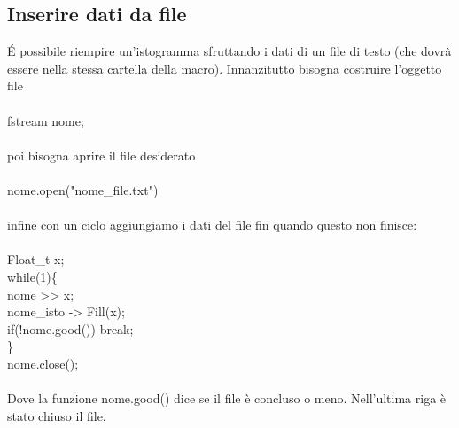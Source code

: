 \documentclass[10pt,a4paper]{article}
\begin{document}
\subsection{Inserire dati da file}
\'{E} possibile riempire un'istogramma sfruttando i dati di un file di testo (che dovrà essere nella stessa cartella della macro). Innanzitutto bisogna costruire l'oggetto file\\\\
fstream nome;\\\\
poi bisogna aprire il file desiderato\\\\
nome.open("nome\_file.txt")\\\\
infine con un ciclo aggiungiamo i dati del file fin quando questo non finisce:\\\\
Float\_t x;\\
while(1)\{\\
	nome >> x;\\
	nome\_isto -> Fill(x);\\
	if(!nome.good()) break;\\
\}\\
nome.close();\\\\

Dove la funzione nome.good() dice se il file è concluso o meno. Nell'ultima riga è stato chiuso il file. 
\end{document}
